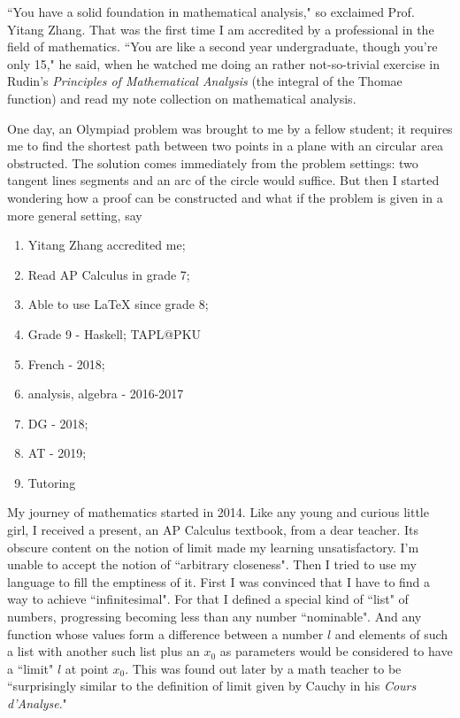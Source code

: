 \documentclass[10pt]{article}
\begin{document}
\begin{CJK*}{UTF8}{gbsn}
\noindent\makebox[\linewidth]{\rule{\paperwidth}{0.4pt}}

``You have a solid foundation in mathematical analysis," so exclaimed Prof. Yitang Zhang. That was the first time I am accredited by a professional in the field of mathematics. ``You are like a second year undergraduate, though you're only 15," he said, when he watched me doing an rather not-so-trivial exercise in Rudin's \textit{Principles of Mathematical Analysis} (the integral of the Thomae function) and read my note collection on mathematical analysis.

\noindent\makebox[\linewidth]{\rule{\paperwidth}{0.4pt}}

One day, an Olympiad problem was brought to me by a fellow student; it requires me to find the shortest path between two points in a plane with an circular area obstructed. The solution comes immediately from the problem settings: two tangent lines segments and an arc of the circle would suffice. But then I started wondering how a proof can be constructed and what if the problem is given in a more general setting, say 

\noindent\makebox[\linewidth]{\rule{\paperwidth}{0.4pt}}

\begin{enumerate}
\item Yitang Zhang accredited me;
\item Read AP Calculus in grade 7;
\item Able to use {\LaTeX} since grade 8;
\item Grade 9 - Haskell; TAPL@PKU
\item French - 2018;
\item analysis, algebra - 2016-2017
\item DG - 2018;
\item AT - 2019;
\item Tutoring
\end{enumerate}

\newpage
My journey of mathematics started in 2014. Like any young and curious little girl, I received a present, an AP Calculus textbook, from a dear teacher. Its obscure content on the notion of limit made my learning unsatisfactory. I'm unable to accept the notion of ``arbitrary closeness". Then I tried to use my language to fill the emptiness of it. First I was convinced that I have to find a way to achieve ``infinitesimal". For that I defined a special kind of ``list" of numbers, progressing becoming less than any number ``nominable". And any function whose values form a difference between a number $l$ and elements of such a list with another such list plus an $x_0$ as parameters would be considered to have a ``limit" $l$ at point $x_0$. This was found out later by a math teacher to be ``surprisingly similar to the definition of limit given by Cauchy in his \textit{Cours d'Analyse}."


\end{CJK*}
\end{document}
